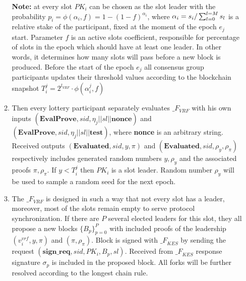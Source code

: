 \begin{enumerate}
\begin{enumerate}
        \textbf{Note:} at every slot $PK_i$ can be chosen as the slot leader with the probability ${p_i = \phi(\alpha_i, f) = 1-(1-f)^{\alpha_i}}$, where ${\alpha_i=s_i/\\\sum_{l=0}^{l=M} s_l}$ is a relative stake of the participant, fixed at the moment of the epoch $e_j$ start.
        Parameter $f$ is an active slots coefficient, responsible for percentage of slots in the epoch which should have at least one leader.
        In other words, it determines how many slots will pass before a new block is produced.
        Before the start of the epoch $e_j$ all consensus group participants updates their threshold values according to the blockchain snapshot ${T_i^j = 2^{l_{VRF}}\cdot \phi(\alpha_i^j, f)}$
        \item Then every lottery participant separately evaluates ${\mathcal_{F}}_{VRF}$ with his own inputs ${(\textbf{EvalProve}, sid, \eta_j || sl || \textbf{nonce})}$ and ${(\textbf{EvalProve}, sid, \eta_j || sl || \textbf{test})}$, where \textbf{nonce} is an arbitrary string.
        Received outputs ${(\textbf{Evaluated}, sid, y, \pi)}$ and ${(\textbf{Evaluated}, sid, \rho_y, \rho_\pi)}$ respectively includes generated random numbers ${y, \rho_y}$ and the associated proofs ${\pi, \rho_\pi}$.
        If ${y < T_i^j}$ then $PK_i$ is a slot leader. Random number $\rho_y$ will be used to sample a random seed for the next epoch.


        \item The ${\mathcal_{F}}_{VRF}$ is designed in such a way that not every slot has a leader, moreover, most of the slots remain empty to serve protocol synchronization.
        If there are $P$ several elected leaders for this slot, they all propose a new blocks $\{B_p\}_{p=0}^P$ with included proofs of the leadership ${(v_i^{vrf}, y, \pi)}$ and
        ${(\pi, \rho_\pi)}$. Block is signed with ${\mathcal_{F}}_{KES}$ by sending the request ${(\textbf{sign\_req}, sid, PK_i, B_p, sl)}$.
        Received from ${\mathcal_{F}}_{KES}$ response signature $\sigma_p$ is included in the proposed block.
        All forks will be further resolved according to the longest chain rule.
    \end{enumerate}


\end{enumerate}
